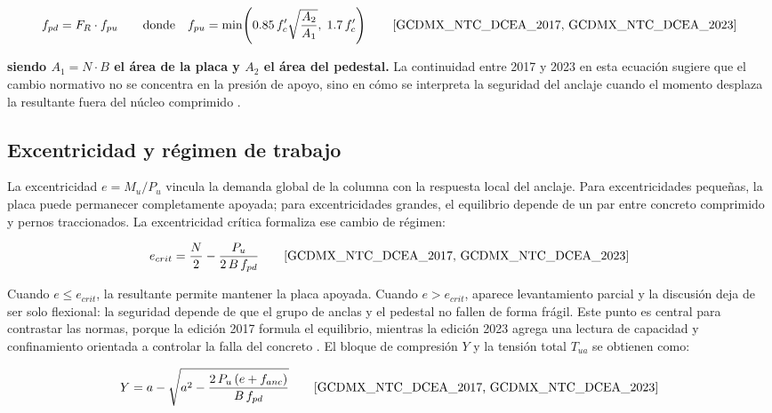 \begin{equation}
  f_{pd} = F_R \cdot f_{pu} \qquad \text{donde} \quad
  f_{pu} = \min\!\left(0.85\,f'_c\sqrt{\frac{A_2}{A_1}},\; 1.7\,f'_c\right)
  \qquad \text{\cite{GCDMX_NTC_DCEA_2017, GCDMX_NTC_DCEA_2023}}
  \label{eq:fpd}
\end{equation}

\noindent\textbf{siendo $A_1=N\cdot B$ el área de la placa y $A_2$ el área del pedestal.} La continuidad entre 2017 y 2023 en esta ecuación sugiere que el cambio normativo no se concentra en la presión de apoyo, sino en cómo se interpreta la seguridad del anclaje cuando el momento desplaza la resultante fuera del núcleo comprimido \cite{GCDMX_NTC_DCEA_2017, GCDMX_NTC_DCEA_2023}.

\subsection{Excentricidad y régimen de trabajo}

La excentricidad $e=M_u/P_u$ vincula la demanda global de la columna con la respuesta local del anclaje. Para excentricidades pequeñas, la placa puede permanecer completamente apoyada; para excentricidades grandes, el equilibrio depende de un par entre concreto comprimido y pernos traccionados. La excentricidad crítica formaliza ese cambio de régimen:

\begin{equation}
  e_{crit} = \frac{N}{2} - \frac{P_u}{2\,B\,f_{pd}}
  \qquad \text{\cite{GCDMX_NTC_DCEA_2017, GCDMX_NTC_DCEA_2023}}
  \label{eq:ecrit}
\end{equation}

Cuando $e \leq e_{crit}$, la resultante permite mantener la placa apoyada. Cuando $e>e_{crit}$, aparece levantamiento parcial y la discusión deja de ser solo flexional: la seguridad depende de que el grupo de anclas y el pedestal no fallen de forma frágil. Este punto es central para contrastar las normas, porque la edición 2017 formula el equilibrio, mientras la edición 2023 agrega una lectura de capacidad y confinamiento orientada a controlar la falla del concreto \cite{GCDMX_NTC_DCEA_2017, GCDMX_NTC_DCEA_2023}. El bloque de compresión $Y$ y la tensión total $T_{ua}$ se obtienen como:

\begin{equation}
  Y = a - \sqrt{a^2 - \frac{2\,P_u\,(e + f_{anc})}{B\,f_{pd}}}
  \qquad \text{\cite{GCDMX_NTC_DCEA_2017, GCDMX_NTC_DCEA_2023}}
  \label{eq:Y}
\end{equation}

